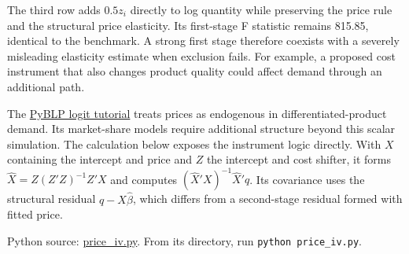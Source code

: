 The third row adds \(0.5z_i\) directly to log quantity while preserving
the price rule and the structural price elasticity. Its first-stage F
statistic remains 815.85, identical to the benchmark. A strong first
stage therefore coexists with a severely misleading elasticity estimate
when exclusion fails. For example, a proposed cost instrument that also
changes product quality could affect demand through an additional path.

The
\href{https://pyblp.readthedocs.io/en/stable/_notebooks/tutorial/logit_nested.html}{PyBLP
logit tutorial} treats prices as endogenous in differentiated-product
demand. Its market-share models require additional structure beyond this
scalar simulation. The calculation below exposes the instrument logic
directly. With \(X\) containing the intercept and price and \(Z\) the
intercept and cost shifter, it forms \(\widehat X=Z(Z'Z)^{-1}Z'X\) and
computes \((\widehat X'X)^{-1}\widehat X'q\). Its covariance uses the
structural residual \(q-X\widehat\beta\), which differs from a
second-stage residual formed with fitted price.

\FloatBarrier
{}
Python source:
\href{../03_Data_and_Code/Lecture_Examples/price_iv.py}{price\_iv.py}.
From its directory, run \texttt{python\ price\_iv.py}.

